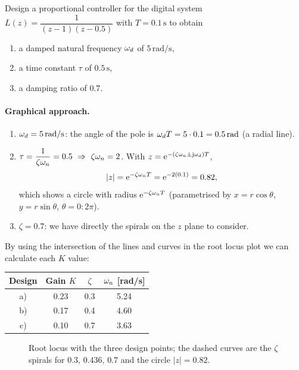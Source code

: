 \begin{example}
Design a proportional controller for the digital system $L(z)=\dfrac{1}{(z-1)(z-0.5)}$ with $T=0.1\,\mathrm{s}$
to obtain
\begin{enumerate}
  \item[a)] a damped natural frequency $\omega_d$ of $5\,\mathrm{rad/s}$,
  \item[b)] a time constant $\tau$ of $0.5\,\mathrm{s}$,
  \item[c)] a damping ratio of $0.7$.
\end{enumerate}

\paragraph{Graphical approach.}
\begin{enumerate}
  \item[a)] $\omega_d=5\,\mathrm{rad/s}$: the angle of the pole is $\omega_d T=5\cdot0.1=0.5\,\mathrm{rad}$ (a radial line).
  \item[b)] $\tau=\dfrac{1}{\zeta\wn}=0.5\ \Rightarrow\ \zeta\wn=2$. With $z=\mathrm{e}^{-(\zeta\omega_n\pm\mathrm{j}\omega_d)T}$,
  \[
    |z|=\mathrm{e}^{-\zeta\omega_n T}=\mathrm{e}^{-2(0.1)}=0.82,
  \]
  which shows a circle with radius $\mathrm{e}^{-\zeta\omega_n T}$ (parametrised by $x=r\cos\theta$, $y=r\sin\theta$,
  $\theta=0:2\pi$).
  \item[c)] $\zeta=0.7$: we have directly the spirals on the $z$ plane to consider.
\end{enumerate}
By using the intersection of the lines and curves in the root locus plot we can calculate each $K$ value:
\begin{center}
\renewcommand{\arraystretch}{1.3}
\begin{tabular}{c c c c}
Design & Gain $K$ & $\zeta$ & $\omega_n$ [rad/s]\\\hline
a) & 0.23 & 0.3 & 5.24\\
b) & 0.17 & 0.4 & 4.60\\
c) & 0.10 & 0.7 & 3.63
\end{tabular}
\end{center}

\begin{figure}[H]
\centering
\figRLdesign
\caption{Root locus with the three design points; the dashed curves are the $\zeta$ spirals for
$0.3,\,0.436,\,0.7$ and the circle $|z|=0.82$.}
\end{figure}


\end{example}
